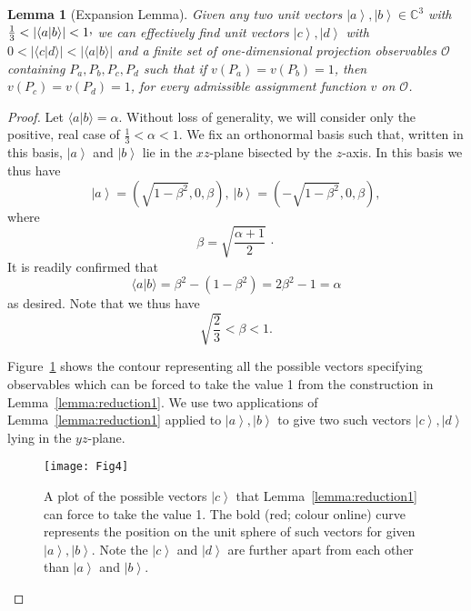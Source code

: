 \documentclass[%
 superscriptaddress,
 preprint,
 showpacs,
 showkeys,
 nofootinbib,
  amsmath,amssymb,
  aps,
  longbibliography,
  floatfix,
 ]{revtex4-1}
\newtheorem{lemma}{Lemma}
\theoremstyle{definition}
\newcommand{\C}{\mathbb{C}}
\newcommand{\ket}[1]{\left| #1 \right>}
\newcommand{\iprod}[2]{\langle #1 | #2 \rangle}
\begin{document}
\begin{lemma}[Expansion Lemma]
	\label{lemma:reduction2}
	Given any two unit vectors $\ket{a},\ket{b}\in\C^3$ with $\frac{1}{3} < |\iprod{a}{b}|<1\raisebox{.8mm}{,}$ we can effectively find unit vectors $\ket{c},\ket{d}$ with $0<|\iprod{c}{d}|<|\iprod{a}{b}|$ and a finite set of {\color{blue}one-dimensional projection} observables $\mathcal{O}$ containing $P_a,P_b,P_c,P_d$ such that if $v(P_a)=v(P_b)=1$, then $v(P_{c})=v(P_{d})=1$, for
every admissible assignment function  $v$  on $\mathcal{O}$.
\end{lemma}
\begin{proof}
	Let $\iprod{a}{b}=\alpha$.
	Without loss of generality, we will consider only the positive, real case of $\frac{1}{3}<\alpha <1$.
	We fix an orthonormal basis such that, written in this basis, $\ket{a}$ and $\ket{b}$ lie in the $xz$-plane bisected by the $z$-axis.
	In this basis we thus have
	$$\ket{a}=\left(\sqrt{1-\beta^2},0,\beta\right),\ \ket{b}=\left(-\sqrt{1-\beta^2},0,\beta\right),$$
	where
	\begin{equation}\label{eqn:beta}
		\beta=\sqrt{\frac{\alpha+1}{2}}\,\cdot
	\end{equation}
	It is readily confirmed that
	$$\iprod{a}{b}=\beta^2-(1-\beta^2)=2\beta^2-1=\alpha$$
	as desired.
	Note that
	we thus have
	\begin{equation}\label{eq:betaBound}\sqrt{\frac{2}{3}}<\beta<1.\end{equation}
	
	
	
	Figure~\ref{fig:lemma2sphere} shows the contour representing all the possible vectors specifying observables which can be forced to take the value 1 from the construction in Lemma~\ref{lemma:reduction1}.
	We use two applications of Lemma~\ref{lemma:reduction1} applied to $\ket{a},\ket{b}$ to give two such vectors $\ket{c},\ket{d}$ lying in the $yz$-plane. %
	
	\begin{figure}[ht]
	\begin{center}
		\texttt{[image: Fig4]}
	\end{center}
	\caption{A plot of the possible vectors $\ket{c}$ that Lemma~\ref{lemma:reduction1} can force to take the value 1. The bold (red; colour online) curve represents the position on the unit sphere of such vectors for given $\ket{a},\ket{b}$. Note the $\ket{c}$ and $\ket{d}$ are further apart from each other than $\ket{a}$ and $\ket{b}$.}
	\label{fig:lemma2sphere}
	\end{figure}
	

\end{proof}
\end{document}
